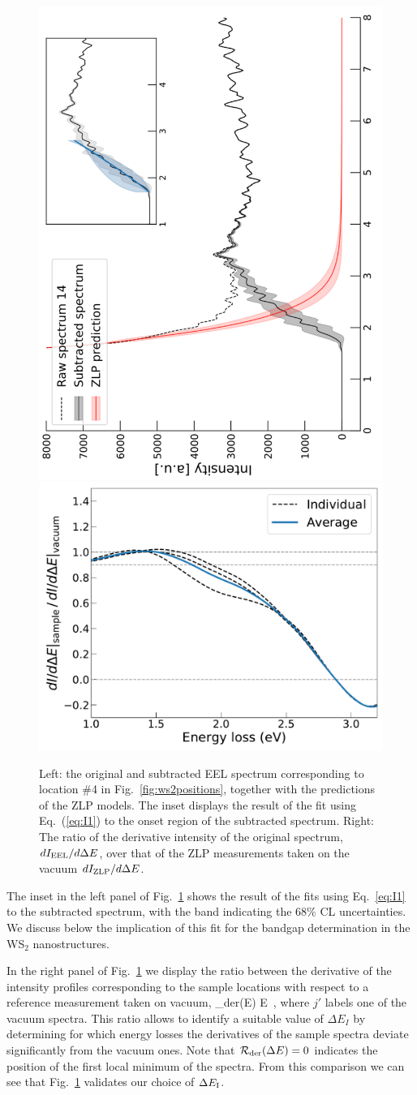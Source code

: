 \begin{figure}[t]
\begin{centering}
  \includegraphics[width=0.36\linewidth,angle=-90]{plots/sp4_subtracted_spectrum.pdf}
   \includegraphics[width=0.36\linewidth,angle=-90]{plots/Derivatives_sp4.pdf}
   \caption{Left: the original
     and subtracted EEL spectrum corresponding to location \#4 in Fig.~\ref{fig:ws2positions},
     together with the predictions of the ZLP models.
     The inset displays the result of the fit using Eq.~(\ref{eq:I1}) to the onset
     region of the subtracted spectrum.
     Right: The ratio of the derivative intensity of the original spectrum, $dI_{\rm EEL}/d\Delta E$,
     over that of the ZLP measurements taken on the vacuum $d I_{\rm ZLP}/d\Delta E$.
  }
\label{fig:sp4_subtracted_spectrum}
\end{centering}
\end{figure}

The inset in the left panel of Fig.~\ref{fig:sp4_subtracted_spectrum}
shows the result of the  fits using Eq.~\ref{eq:I1} to the subtracted spectrum,
with the band indicating the 68\% CL uncertainties.
%
We discuss below the implication of this fit for the bandgap determination
in the WS$_2$ nanostructures.

In the right panel of  Fig.~\ref{fig:sp4_subtracted_spectrum} we display the ratio
between the derivative of the intensity profiles corresponding to the sample locations
with respect to a reference measurement taken on vacuum,
\be
{}_{\rm der}(\Delta E) \equiv 
{}\lp \Delta E\rp \, ,
\ee
where $j'$ labels one of the vacuum spectra.
%
This ratio allows to identify a suitable value of $\Delta E_{I}$ by determining
for which energy losses the derivatives of the sample spectra deviate significantly
from the vacuum ones.
%
Note that $\mathcal{R}_{\rm der}(\Delta E)=0$ indicates the position of the first
local minimum of the spectra.
%
From this comparison we can see that Fig.~\ref{fig:sp4_subtracted_spectrum} validates our choice of
$\Delta E_{\rm I}$.

